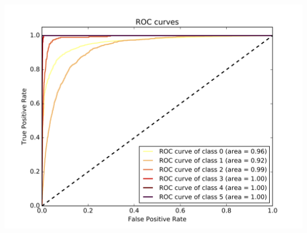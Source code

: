 \documentclass[c]{beamer}
\begin{document}
\begin{frame}
\begin{columns}
\begin{column}{0.6\textwidth}
      \centering\vfill
      \includegraphics[scale=0.18]{../../data/France/test/Neural_Network_Classification-oversampling/Neural_Network_Classification-oversampling_roc.png}
\end{column}
\end{columns}
\end{frame}
\end{document}
